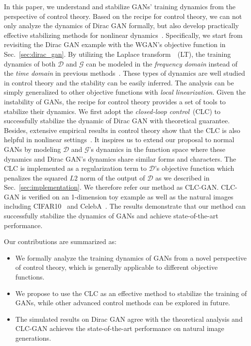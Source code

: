 \documentclass{article}
\newcommand{\xG}{\mathcal{G}}
\newcommand{\xD}{\mathcal{D}}
\newcommand{\secref}[1]{Sec.~\ref{sec:#1}} \usepackage{wrapfig}
\theoremstyle{definition}
\begin{document}
In this paper, we understand and stabilize GANs' training dynamics from the perspective of control theory.
Based on the recipe for control theory, we can not only analyze the dynamics of Dirac GAN formally, but also develop practically effective stabilizing methods for nonlinear dynamics~\cite{khalil2002nonlinear}.
Specifically, we start from revisiting the Dirac GAN example with the WGAN's objective function in \secref{dirac_gan}. By utilizing the Laplace transform~\cite{widder2015laplace}~(LT), the training dynamics of both $\xD$ and $\xG$ can be modeled in the {\it frequency domain} instead of the {\it time domain} in previous methods~\cite{mescheder2017numerics, mescheder2018training}.
These types of dynamics are well studied in control theory and the stability can be easily inferred. The analysis can be simply generalized to other objective functions with {\it local linearization}. Given the instability of GANs, the recipe for control theory provides a set of tools to stabilize their dynamics.
We first adopt the {\it closed-loop control}~(CLC) to successfully stabilize the dynamic of Dirac GAN with theoretical guarantee.
Besides, extensive empirical results in control theory show that the CLC is also helpful in nonlinear settings~\cite{khalil2002nonlinear}.
It inspires us to extend our proposal to normal GANs by modeling $\xD$ and $\xG$'s dynamics in the function space where these dynamics and Dirac GAN's dynamics share similar forms and characters.
The CLC is implemented as a regularization term to $\xD$'s objective function which penalizes the squared $L2$ norm of the output of $\xD$ as we described in \secref{implementation}.
We therefore refer our method as CLC-GAN.
CLC-GAN is verified on an 1-dimension toy example as well as the natural images including CIFAR10~\citep{krizhevsky2009learning} and CelebA~\citep{liu2015faceattributes}. The results demonstrate that our method can successfully stabilize the dynamics of GANs and achieve state-of-the-art performance.


Our contributions are summarized as:
\begin{itemize}
\setlength\itemsep{-2pt}
	\item We formally analyze the training dynamics of GANs from a novel perspective of control theory, which is generally applicable to different objective functions.
	\item We propose to use the CLC as an effective method to stabilize the training of GANs, while other advanced control methods can be explored in future. \item The simulated results on Dirac GAN agree with the theoretical analysis and CLC-GAN achieves the state-of-the-art performance on natural image generations.
\end{itemize}
\end{document}
